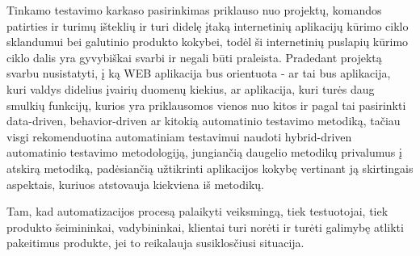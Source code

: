 Tinkamo testavimo karkaso pasirinkimas priklauso nuo projektų, komandos patirties ir turimų išteklių ir turi didelę įtaką internetinių aplikacijų kūrimo ciklo sklandumui bei galutinio produkto kokybei, todėl ši internetinių puslapių kūrimo ciklo dalis yra gyvybiškai svarbi ir negali būti praleista. Pradedant projektą svarbu nusistatyti, į ką WEB aplikacija bus orientuota - ar tai bus aplikacija, kuri valdys didelius įvairių duomenų kiekius, ar aplikacija, kuri turės daug smulkių funkcijų, kurios yra priklausomos vienos nuo kitos ir pagal tai pasirinkti data-driven, behavior-driven ar kitokią automatinio testavimo metodiką, tačiau visgi rekomenduotina automatiniam testavimui naudoti hybrid-driven automatinio testavimo metodologiją, jungiančią daugelio metodikų privalumus į atskirą metodiką, padėsiančią užtikrinti aplikacijos kokybę vertinant ją skirtingais aspektais, kuriuos atstovauja kiekviena iš metodikų.

Tam, kad automatizacijos procesą palaikyti veiksmingą, tiek testuotojai, tiek produkto šeimininkai, vadybininkai, klientai turi norėti ir turėti galimybę atlikti pakeitimus produkte, jei to reikalauja susiklosčiusi situacija.
